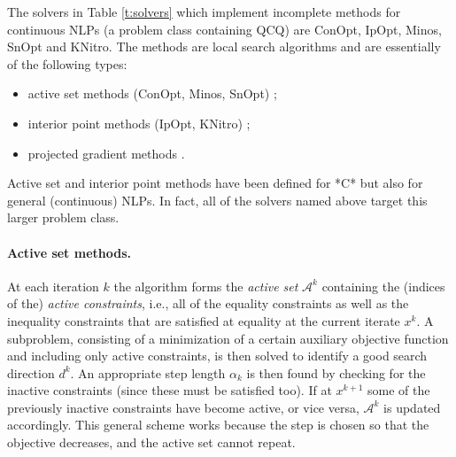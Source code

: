 The solvers in Table \ref{t:solvers} which implement incomplete methods for continuous NLPs (a problem class containing QCQ) are {\sc ConOpt}, {\sc IpOpt}, {\sc Minos}, {\sc SnOpt} and {\sc KNitro}. The methods are local search algorithms and are essentially of the following types: %
\begin{itemize}
 \item active set methods ({\sc ConOpt}, {\sc Minos}, {\sc SnOpt}) \cite{Dost09};
 \item interior point methods ({\sc IpOpt}, {\sc KNitro}) \cite{Wright97};
 \item projected gradient methods \cite{CalaMore87:mp,ChenGui13:coap}.
\end{itemize} 
%
Active set and interior point methods have been defined for *C* but also for general (continuous) NLPs. In fact, all of the solvers named above target this larger problem class.

\paragraph{Active set methods.}
%
At each iteration $k$ the algorithm forms the {\it active set} $\mathcal{A}^k$ containing the (indices of the) {\it active constraints}, i.e., all of the equality constraints as well as the inequality constraints that are satisfied at equality at the current iterate $x^k$. A subproblem, consisting of a minimization of a certain auxiliary objective function and including only active constraints, is then solved to identify a good search direction $d^k$. An appropriate step length $\alpha_k$ is then found by checking for the inactive constraints (since these must be satisfied too). If at $x^{k+1}$ some of the previously inactive constraints have become active, or vice versa, $\mathcal{A}^k$ is updated accordingly. This general scheme works because the step is chosen so that the objective decreases, and the active set cannot repeat. 

